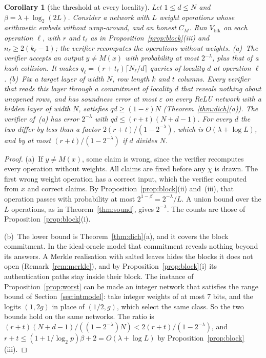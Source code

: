 \documentclass[conference,compsoc]{IEEEtran}
\theoremstyle{plain}
\newtheorem{corollary}{Corollary}
\theoremstyle{definition}
\theoremstyle{remark}
\begin{document}
\begin{corollary}[the threshold at every locality]
\label{cor:block}
Let $1\le d\le N$ and $\beta=\lambda+\log_2(2L)$. Consider a network with $L$ weight operations whose
arithmetic embeds without wrap-around, and an honest $C_M$. Run $V_{\mathrm{blk}}$ on each operation
$\ell$, with $r$ and $t_\ell$ as in Proposition~\ref{prop:block}(iii) and $n_\ell\ge2(k_\ell-1)$; the
verifier recomputes the operations without weights.
(a)~The verifier accepts an output $y\neq M(x)$ with probability at most $2^{-\lambda}$, plus that of
a hash collision. It makes $q_\ell=(r+t_\ell)\lceil N_\ell/d\rceil$ queries of locality $d$ at
operation $\ell$.
(b)~Fix a target layer of width $N$, row length $k$ and $t$ columns. Every verifier that reads this
layer through a commitment of locality $d$ that reveals nothing about unopened rows, and has
soundness error at most $\varepsilon$ on every ReLU network with a hidden layer of width $N$,
satisfies $qd\ge(1-\varepsilon)N$ (Theorem~\ref{thm:dich}(a)). The verifier of~(a) has error $2^{-\lambda}$
with $qd\le(r+t)(N+d-1)$. For every $d$ the two differ by less than a factor
$2(r+t)/(1-2^{-\lambda})$, which is $O(\lambda+\log L)$, and by at most $(r+t)/(1-2^{-\lambda})$ if
$d$ divides $N$.
\end{corollary}

\begin{proof}
(a)~If $y\neq M(x)$, some claim is wrong, since the verifier recomputes every operation without
weights. All claims are fixed before any $\chi$ is drawn. The first wrong weight operation has a
correct input, which the verifier computed from $x$ and correct claims. By
Proposition~\ref{prop:block}(ii) and~(iii), that operation passes with probability at most
$2^{1-\beta}=2^{-\lambda}/L$. A union bound over the $L$ operations, as in Theorem~\ref{thm:sound},
gives $2^{-\lambda}$. The counts are those of Proposition~\ref{prop:block}(i).

(b)~The lower bound is Theorem~\ref{thm:dich}(a), and it covers the block commitment. In the
ideal-oracle model that commitment reveals nothing beyond its answers. A Merkle realisation with
salted leaves hides the blocks it does not open (Remark~\ref{rem:merkle}), and by
Proposition~\ref{prop:block}(i) its authentication paths stay inside their block. The instance of
Proposition~\ref{prop:worst} can be made an integer network that satisfies the range bound of
Section~\ref{sec:intmodel}: take integer weights of at most 7 bits, and the logits $(1,2g)$ in place
of $(1/2,g)$, which select the same class. So the two bounds hold on the same networks. The ratio is
$(r+t)(N+d-1)/((1-2^{-\lambda})N)<2(r+t)/(1-2^{-\lambda})$, and
$r+t\le(1+1/\log_2p)\beta+2=O(\lambda+\log L)$ by Proposition~\ref{prop:block}(iii).
\end{proof}
\end{document}
